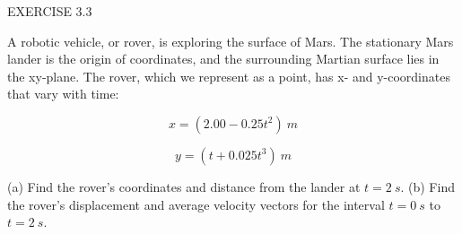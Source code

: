 \documentclass[]{beamer}
\begin{document}

\begin{frame}
EXERCISE 3.3

    \vspace{3mm}

A robotic vehicle, or rover, is exploring the surface of Mars. The
stationary Mars lander is the origin of coordinates, and the surrounding
Martian surface lies in the xy-plane. The rover, which we
represent as a point, has x- and y-coordinates that vary with time:
 

  \vspace{3mm}

         \begin{equation}
  x=(2.00-0.25t^2)~m
         \end{equation}

         \begin{equation}
  y=(t+0.025t^3)~m
         \end{equation}

 \vspace{3mm}

(a) Find the rover’s coordinates and distance from the lander at $t=2~s$.
(b) Find the rover’s displacement and average velocity
vectors for the interval $t=0~s$ to $t=2~s$.

\end{frame}







\end{document}
